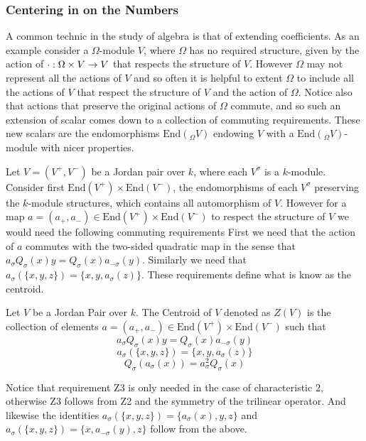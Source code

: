 \subsubsection{Centering in on the Numbers}
A common technic in the study of algebra is that of extending coefficients.
As an example consider a $\Omega$-module $V$, where $\Omega$ has no required structure, given by the action of 
$\cdot:\Omega\times V\rightarrow V$ that respects the structure of $V$. However $\Omega$ may not
represent all the actions of $V$ and so often it is helpful to extent $\Omega$ to include all the actions of $V$ that respect the structure of $V$ and the action of $\Omega$.
Notice also that actions that preserve the original actions of $\Omega$ commute, and so such an extension of scalar comes down to a collection of commuting requirements.
These new scalars are the endomorphisms $\text{End}(_\Omega V)$ endowing $V$ with a $\text{End}(_\Omega V)$-module with nicer properties.


Let $V=(V^+,V^-)$ be a Jordan pair over $k$, where each $V^\sigma$ is a $k$-module. 
Consider first $\text{End}(V^+)\times\text{End}(V^-)$, the endomorphisms of each $V^\sigma$ preserving the $k$-module structures,
which contains all automorphism of $V$.
However for a map $a=(a_+,a_-)\in\text{End}(V^+)\times\text{End}(V^-)$ to respect the structure of $V$ we would need the following commuting requirements
First we need that the action of $a$ commutes with the two-sided quadratic map in the sense that 
$a_\sigma Q_\sigma(x)y=Q_\sigma(x)a_{-\sigma}(y)$. Similarly we need that 
$a_\sigma(\{x,y,z\})=\{x,y,a_\sigma(z)\}$. These requirements define what is know as the centroid.

\begin{definition}
    Let $V$ be a Jordan Pair over $k$. The Centroid of $V$ denoted as $Z(V)$ is 
    the collection of elements $a=(a_+,a_-)\in\text{End}(V^+)\times\text{End}(V^-)$ such that
    \begin{equation}
        \tag{Z1}
        a_\sigma Q_\sigma(x)y=Q_\sigma(x)a_{-\sigma}(y)
    \end{equation}
    \begin{equation}
        \tag{Z2}
        a_\sigma(\{x,y,z\})=\{x,y,a_\sigma(z)\}
    \end{equation}
    \begin{equation}
        \tag{Z3}
        Q_{\sigma}(a_{\sigma}(x))=a_{\sigma}^2Q_{\sigma}(x)
    \end{equation}
\end{definition}
Notice that requirement Z3 is only needed in the case of characteristic $2$, otherwise Z3 follows from Z2 and the symmetry of the trilinear operator. And likewise the identities
$a_\sigma(\{x,y,z\})=\{a_\sigma(x),y,z\}$ and $a_\sigma(\{x,y,z\})=\{x,a_{-\sigma}(y),z\}$ follow from the above.

